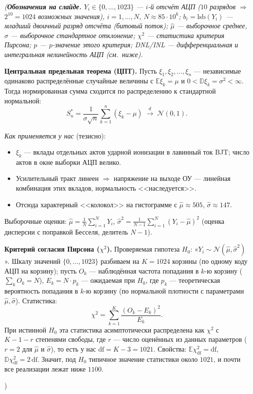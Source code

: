 \documentclass[12pt,a4paper]{extarticle}
\newcommand{\note}[1]{%
  \par
  {\small\color{noteclr}\itshape (#1)}%
  \par}
\begin{document}
\note{\textbf{Обозначения на слайде.}
$Y_i\in\{0,\ldots,1023\}$ --- $i$-й отсчёт АЦП ($10$ разрядов $\Rightarrow$
$2^{10}=1024$ возможных значения), $i=1,\ldots,N$, $N\approx 85\cdot 10^6$;
$b_i=\mathrm{lsb}(Y_i)$ --- младший двоичный разряд отсчёта (битовый поток);
$\hat\mu$ --- выборочное среднее, $\hat\sigma$ --- выборочное стандартное
отклонение; $\chi^2$ --- статистика критерия Пирсона; $p$ --- $p$-значение
этого критерия; DNL/INL --- дифференциальная и интегральная нелинейность
АЦП (см.\ ниже).

\textbf{Центральная предельная теорема (ЦПТ).} Пусть
$\xi_1,\xi_2,\ldots,\xi_n$ --- независимые одинаково распределённые
случайные величины с $\mathbb{E}\xi_k=\mu$ и
$0<\mathbb{D}\xi_k=\sigma^2<\infty$. Тогда нормированная сумма сходится по
распределению к стандартной нормальной:
\[
S_n^*=\frac{1}{\sigma\sqrt{n}}\sum_{k=1}^{n}(\xi_k-\mu)
\;\xrightarrow{d}\;\mathcal{N}(0,1).
\]

\emph{Как применяется у нас} (тезисно):
\begin{itemize}\setlength{\itemsep}{0.1em}
  \item $\xi_k$ --- вклады отдельных актов ударной ионизации в лавинный ток
        BJT; число актов в окне выборки АЦП велико.
  \item Усилительный тракт линеен $\Rightarrow$ напряжение на выходе ОУ ---
        линейная комбинация этих вкладов, нормальность <<наследуется>>.
  \item Отсюда характерный <<колокол>> на гистограмме с
        $\hat\mu\!\approx\!505$, $\hat\sigma\!\approx\!147$.
\end{itemize}
Выборочные оценки:
$\hat\mu=\frac{1}{N}\sum_{i=1}^{N}Y_i$,
$\hat\sigma^2=\frac{1}{N-1}\sum_{i=1}^{N}(Y_i-\hat\mu)^2$
(оценка дисперсии с поправкой Бесселя, делитель $N-1$).

\textbf{Критерий согласия Пирсона ($\chi^2$).} Проверяемая гипотеза $H_0$:
«$Y_i\sim\mathcal{N}(\hat\mu,\hat\sigma^2)$». Шкалу значений
$\{0,\ldots,1023\}$ разбиваем на $K=1024$ корзины (по одному коду АЦП на
корзину); пусть $O_k$ --- наблюдённая частота попадания в $k$-ю корзину
($\sum_k O_k=N$), $E_k=N\cdot p_k$ --- ожидаемая при $H_0$, где $p_k$ ---
теоретическая вероятность попадания в $k$-ю корзину (по нормальной
плотности с параметрами $\hat\mu,\hat\sigma$). Статистика:
\[
\chi^2=\sum_{k=1}^{K}\frac{(O_k-E_k)^2}{E_k}.
\]
При истинной $H_0$ эта статистика асимптотически распределена как $\chi^2$
с $K-1-r$ степенями свободы, где $r$ --- число оценённых из данных
параметров ($r=2$ для $\hat\mu$ и $\hat\sigma$), то есть у нас
$\mathrm{df}=K-3=1021$. Свойства: $\mathbb{E}\chi^2_\mathrm{df}=\mathrm{df}$,
$\mathbb{D}\chi^2_\mathrm{df}=2\,\mathrm{df}$. Значит, под $H_0$ типичное
значение статистики около $1021$, и почти все реализации лежат ниже $1100$.

}
\end{document}
